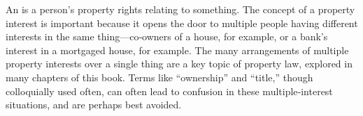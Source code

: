 An  is a person's property rights relating to something. The
concept of a property interest is important because it opens the door to
multiple people having different interests in the same thing---co‑owners of a
house, for example, or a bank's interest in a mortgaged house, for example. The
many arrangements of multiple property interests over a single thing are a key
topic of property law, explored in many chapters of this book. Terms like
``ownership'' and ``title,'' though colloquially used often, can often lead to
confusion in these multiple‑interest situations, and are perhaps best avoided.
